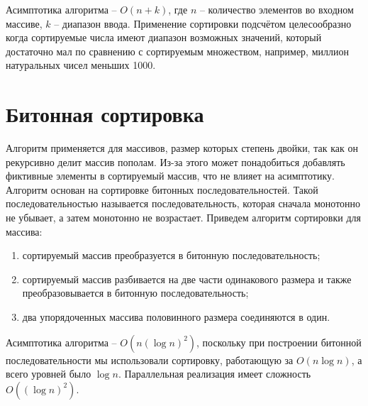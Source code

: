 Асимптотика алгоритма -- $O(n + k)$, где $n$ -- количество элементов во входном массиве, $k$ -- диапазон ввода. Применение сортировки подсчётом целесообразно когда сортируемые числа имеют диапазон возможных значений, который достаточно мал по сравнению с сортируемым множеством, например, миллион натуральных чисел меньших 1000.


\section{Битонная сортировка}

Алгоритм применяется для массивов, размер которых степень двойки, так как он рекурсивно делит массив пополам. Из-за этого может понадобиться добавлять фиктивные элементы в сортируемый массив, что не влияет на асимптотику. Алгоритм основан на сортировке битонных последовательностей. Такой последовательностью называется последовательность, которая сначала монотонно не убывает, а затем монотонно не возрастает. Приведем алгоритм сортировки для массива:
\begin{enumerate}
	\item сортируемый массив преобразуется в битонную последовательность;
	\item сортируемый массив разбивается на две части одинакового размера и также преобразовывается в битонную последовательность;
	\item два упорядоченных массива половинного размера соединяются в один.
\end{enumerate}

Асимптотика алгоритма -- $O(n (\log n)^{2})$, поскольку при построении битонной последовательности мы использовали сортировку, работающую за $O(n\log n)$, а всего уровней было $\log n$. Параллельная реализация имеет сложность $O((\log n)^{2})$.
